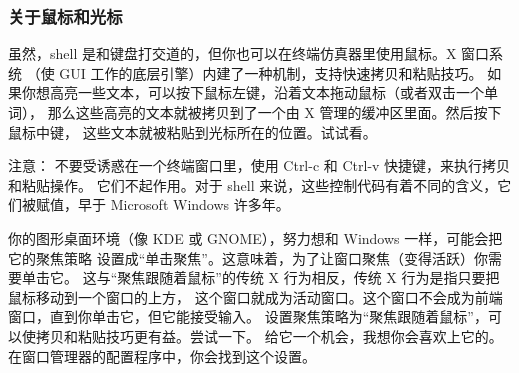 \fboxrule=6pt \fboxsep=4pt
\begin{colorboxed}[boxcolor=lightgray,bgcolor=white]
\subsubsection{关于鼠标和光标}
虽然，shell 是和键盘打交道的，但你也可以在终端仿真器里使用鼠标。X 窗口系统 （使 GUI 工作的底层引擎）内建了一种机制，支持快速拷贝和粘贴技巧。 如果你想高亮一些文本，可以按下鼠标左键，沿着文本拖动鼠标（或者双击一个单词）， 那么这些高亮的文本就被拷贝到了一个由 X 管理的缓冲区里面。然后按下鼠标中键， 这些文本就被粘贴到光标所在的位置。试试看。

\par 注意： 不要受诱惑在一个终端窗口里，使用 Ctrl-c 和 Ctrl-v 快捷键，来执行拷贝和粘贴操作。 它们不起作用。对于 shell 来说，这些控制代码有着不同的含义，它们被赋值，早于 Microsoft Windows 许多年。

\par 你的图形桌面环境（像 KDE 或 GNOME），努力想和 Windows 一样，可能会把它的聚焦策略 设置成“单击聚焦”。这意味着，为了让窗口聚焦（变得活跃）你需要单击它。 这与“聚焦跟随着鼠标”的传统 X 行为相反，传统 X 行为是指只要把鼠标移动到一个窗口的上方， 这个窗口就成为活动窗口。这个窗口不会成为前端窗口，直到你单击它，但它能接受输入。 设置聚焦策略为“聚焦跟随着鼠标”，可以使拷贝和粘贴技巧更有益。尝试一下。 给它一个机会，我想你会喜欢上它的。在窗口管理器的配置程序中，你会找到这个设置。

\end{colorboxed}


